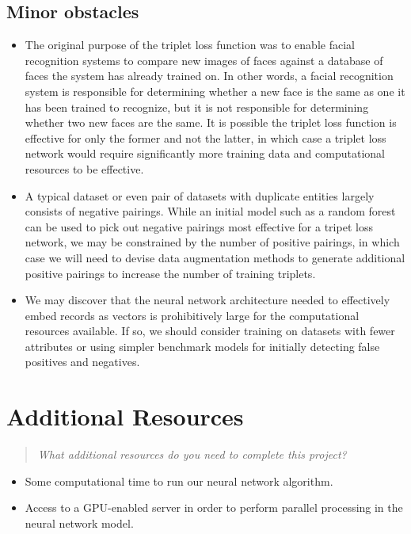 \documentclass{proc}
\begin{document}
\subsection{Minor obstacles}

\begin{itemize}
  \item The original purpose of the triplet loss function was to enable facial recognition systems to compare new images of faces against a database of faces the system has already trained on. In other words, a facial recognition system is responsible for determining whether a new face is the same as one it has been trained to recognize, but it is not responsible for determining whether two new faces are the same. It is possible the triplet loss function is effective for only the former and not the latter, in which case a triplet loss network would require significantly more training data and computational resources to be effective.
  \item A typical dataset or even pair of datasets with duplicate entities largely consists of negative pairings. While an initial model such as a random forest can be used to pick out negative pairings most effective for a tripet loss network, we may be constrained by the number of positive pairings, in which case we will need to devise data augmentation methods to generate additional positive pairings to increase the number of training triplets.
  \item We may discover that the neural network architecture needed to effectively embed records as vectors is prohibitively large for the computational resources available. If so, we should consider training on datasets with fewer attributes or using simpler benchmark models for initially detecting false positives and negatives.
\end{itemize}


\section{Additional Resources}
\begin{quote}
\emph{What additional resources do you need to complete this project?}
\end{quote}

\begin{itemize}
  \item Some computational time to run our neural network algorithm.
  \item Access to a GPU-enabled server in order to perform parallel processing in the neural network model. 
\end{itemize}
 
\end{document}
